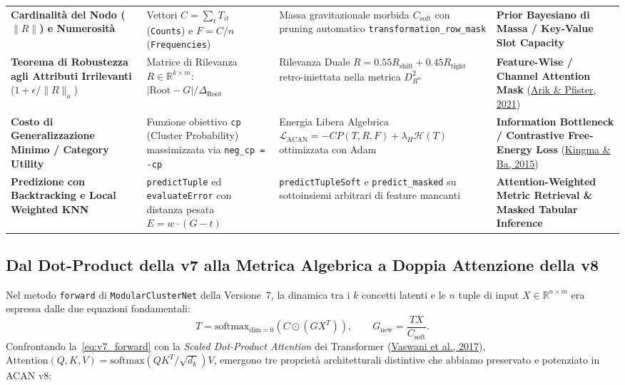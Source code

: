 \documentclass[10pt,a4paper]{article}
\begin{document}
\begin{table}[!htbp]
\begin{tabularx}{\textwidth}{>{\raggedright\arraybackslash}p{} >{\raggedright\arraybackslash}p{} >{\raggedright\arraybackslash}p{} >{\raggedright\arraybackslash}X}
\textbf{Cardinalit\`a del Nodo ($\|R\|$) e Numerosit\`a} &
Vettori $C = \sum_{t} T_{it}$ (\texttt{Counts}) e $F = C/n$ (\texttt{Frequencies}) &
Massa gravitazionale morbida $C_{\text{soft}}$ con pruning automatico \texttt{transformation\_row\_mask} &
\textbf{Prior Bayesiano di Massa / Key-Value Slot Capacity} \\
\addlinespace[2pt]
\textbf{Teorema di Robustezza agli Attributi Irrilevanti} ($1 + \epsilon / \|R\|_a$) &
Matrice di Rilevanza $R \in \mathbb{R}^{k \times m}$: $|\text{Root} - G| / \Delta_{\text{Root}}$ &
Rilevanza Duale $R = 0.55 R_{\text{shift}} + 0.45 R_{\text{tight}}$ retro-iniettata nella metrica $D^2_{R^\alpha}$ &
\textbf{Feature-Wise / Channel Attention Mask} (\href{https://arxiv.org/abs/1908.07442}{Arik \& Pfister, 2021}) \\
\addlinespace[2pt]
\textbf{Costo di Generalizzazione Minimo / Category Utility} &
Funzione obiettivo \texttt{cp} (Cluster Probability) massimizzata via \texttt{neg\_cp = -cp} &
Energia Libera Algebrica $\mathcal{L}_{\text{ACAN}} = -CP(T, R, F) + \lambda_H \mathcal{H}(T)$ ottimizzata con Adam &
\textbf{Information Bottleneck / Contrastive Free-Energy Loss} (\href{https://arxiv.org/abs/1412.6980}{Kingma \& Ba, 2015}) \\
\addlinespace[2pt]
\textbf{Predizione con Backtracking e Local Weighted KNN} &
\texttt{predictTuple} ed \texttt{evaluateError} con distanza pesata $E = w \cdot (G - t)$ &
\texttt{predictTupleSoft} e \texttt{predict\_masked} su sottoinsiemi arbitrari di feature mancanti &
\textbf{Attention-Weighted Metric Retrieval \& Masked Tabular Inference} \\
\bottomrule
\end{tabularx}
\end{table}

\subsection{Dal Dot-Product della v7 alla Metrica Algebrica a Doppia Attenzione della v8}
Nel metodo \texttt{forward} di \texttt{ModularClusterNet} della Versione~7, la dinamica tra i $k$ concetti latenti e le $n$ tuple di input $X \in \mathbb{R}^{n \times m}$ era espressa dalle due equazioni fondamentali:
\begin{equation}
T = \text{softmax}_{\text{dim}=0}\!\left( C \odot (G X^T) \right), \qquad G_{\text{new}} = \frac{T X}{C_{\text{soft}}}.
\label{eq:v7_forward}
\end{equation}
Confrontando la~\eqref{eq:v7_forward} con la \textit{Scaled Dot-Product Attention} dei Transformer (\href{https://arxiv.org/abs/1706.03762}{Vaswani et al., 2017}), $\text{Attention}(Q,K,V) = \text{softmax}(QK^T / \sqrt{d_k})V$, emergono tre propriet\`a architetturali distintive che abbiamo preservato e potenziato in ACAN v8:
\end{document}
